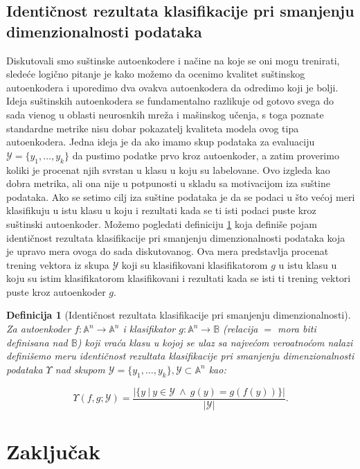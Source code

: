 \documentclass{article}
\newtheorem{definition}{Definicija}
\let\oldsection\section
\renewcommand\section{\clearpage\oldsection}
\begin{document}
	\subsection{Identi\v cnost rezultata klasifikacije pri smanjenju dimenzionalnosti podataka}
	
	Diskutovali smo su\v stinske autoenkodere i na\v cine na koje se oni mogu trenirati, slede\'ce logi\v cno pitanje je kako mo\v zemo da ocenimo kvalitet su\v stinskog autoenkodera i uporedimo dva ovakva autoenkodera da odredimo koji je bolji.
	Ideja su\v stinskih autoenkodera se fundamentalno razlikuje od gotovo svega do sada vi\dj enog u oblasti neurosnkih mre\v za i ma\v sinskog u\v cenja, s toga poznate standardne metrike nisu dobar pokazatelj kvaliteta modela ovog tipa autoenkodera.
	Jedna ideja je da ako imamo skup podataka za evaluaciju $\mathcal{Y} = \{y_1, \dots, y_k\}$ da pustimo podatke prvo kroz autoenkoder, a zatim proverimo koliki je procenat njih svrstan u klasu u koju su labelovane.
	Ovo izgleda kao dobra metrika, ali ona nije u potpunosti u skladu sa motivacijom iza su\v stine podataka.
	Ako se setimo cilj iza su\v stine podataka je da se podaci u \v sto ve\'coj meri klasifikuju u istu klasu u koju i rezultati kada se ti isti podaci puste kroz su\v stinski autoenkoder.
	Mo\v zemo pogledati definiciju \ref{identicality-of-results-of-classification-upon-dimensionality-reduction} koja defini\v se pojam identi\v cnost rezultata klasifikacije pri smanjenju dimenzionalnosti podataka koja je upravo mera ovoga do sada diskutovanog. 
	Ova mera predstavlja procenat trening vektora iz skupa $\mathcal{Y}$ koji su klasifikovani klasifikatorom $g$ u istu klasu u koju su istim klasifikatorom klasifikovani i rezultati kada se isti ti trening vektori puste kroz autoenkoder $g$.
	
	\begin{definition}[Identi\v cnost rezultata klasifikacije pri smanjenju dimenzionalnosti]
		\label{identicality-of-results-of-classification-upon-dimensionality-reduction}
		\sloppy Za autoenkoder $f : \mathbb{A}^n \to \mathbb{A}^n$ i klasifikator $g : \mathbb{A}^n \to \mathbb{B}$ (relacija $=$ mora biti definisana nad $\mathbb{B}$) koji vra\'ca klasu u kojoj se ulaz sa najve\'com veroatno\'com nalazi defini\v semo meru \emph{identi\v cnost rezultata klasifikacije pri smanjenju dimenzionalnosti podataka $\Upsilon$ nad skupom $\mathcal{Y} = \{y_1, \dots, y_k\}, \mathcal {Y} \subset \mathbb{A}^n$} kao:
		
		$$
		\Upsilon (f, g; \mathcal{Y}) = \frac{\left| \{y ~|~ y \in \mathcal{Y}~ \wedge~ g(y) = g(f(y))\}\right|}{\left| \mathcal{Y} \right|}.
		$$
	\end{definition}
	
	
	\section*{Zaklju\v cak}
	
	\pagebreak
	
	
\end{document}
